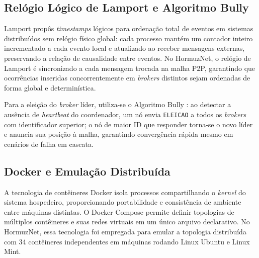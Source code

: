 \subsection{Relógio Lógico de Lamport e Algoritmo Bully}

Lamport \cite{lamport1978time} propôs \textit{timestamps} lógicos para ordenação total de eventos em sistemas distribuídos sem relógio físico global: cada processo mantém um contador inteiro incrementado a cada evento local e atualizado ao receber mensagens externas, preservando a relação de causalidade entre eventos. No HormuzNet, o relógio de Lamport é sincronizado a cada mensagem trocada na malha P2P, garantindo que ocorrências inseridas concorrentemente em \textit{brokers} distintos sejam ordenadas de forma global e determinística.

Para a eleição do \textit{broker} líder, utiliza-se o Algoritmo Bully \cite{tanenbaum2021redes}: ao detectar a ausência de \textit{heartbeat} do coordenador, um nó envia \texttt{ELEICAO} a todos os \textit{brokers} com identificador superior; o nó de maior ID que responder torna-se o novo líder e anuncia sua posição à malha, garantindo convergência rápida mesmo em cenários de falha em cascata.

\subsection{Docker e Emulação Distribuída}

A tecnologia de contêineres Docker isola processos compartilhando o \textit{kernel} do sistema hospedeiro, proporcionando portabilidade e consistência de ambiente entre máquinas distintas. O Docker Compose permite definir topologias de múltiplos contêineres e suas redes virtuais em um único arquivo declarativo. No HormuzNet, essa tecnologia foi empregada para emular a topologia distribuída com 34 contêineres independentes em máquinas rodando Linux Ubuntu e Linux Mint.
